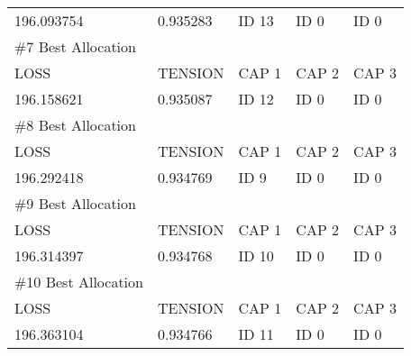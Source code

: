 \documentclass[12pt]{article}
\begin{document}
\begin{table}[]
\begin{tabular}{lllll}
			196.093754                             & 0.935283 & ID 13 & ID 0  & ID 0  \vspace{0.3cm} \\ 
			\#7 Best Allocation                    &          &       &       &       \\ \hline
			LOSS                                   & TENSION  & CAP 1 & CAP 2 & CAP 3 \\
			196.158621                             & 0.935087 & ID 12 & ID 0  & ID 0  \vspace{0.3cm} \\ 
			\#8 Best Allocation                    &          &       &       &       \\ \hline
			LOSS                                   & TENSION  & CAP 1 & CAP 2 & CAP 3 \\
			196.292418                             & 0.934769 & ID 9  & ID 0  & ID 0  \vspace{0.3cm} \\ 
			\#9 Best Allocation                    &          &       &       &       \\ \hline
			LOSS                                   & TENSION  & CAP 1 & CAP 2 & CAP 3 \\
			196.314397                             & 0.934768 & ID 10 & ID 0  & ID 0  \vspace{0.3cm} \\ 
			\#10 Best Allocation                   &          &       &       &       \\ \hline
			LOSS                                   & TENSION  & CAP 1 & CAP 2 & CAP 3 \\
			196.363104                             & 0.934766 & ID 11 & ID 0  & ID 0  \\
		\end{tabular}
	\end{table}
	
\end{document}
